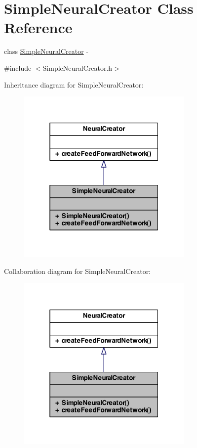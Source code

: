 \hypertarget{class_simple_neural_creator}{
\section{SimpleNeuralCreator Class Reference}
\label{class_simple_neural_creator}
}


class \hyperlink{class_simple_neural_creator}{SimpleNeuralCreator} -\/  




{\ttfamily \#include $<$SimpleNeuralCreator.h$>$}



Inheritance diagram for SimpleNeuralCreator:
\nopagebreak
\begin{figure}[H]
\begin{center}
\leavevmode
\includegraphics[width=244pt]{class_simple_neural_creator__inherit__graph}
\end{center}
\end{figure}


Collaboration diagram for SimpleNeuralCreator:
\nopagebreak
\begin{figure}[H]
\begin{center}
\leavevmode
\includegraphics[width=244pt]{class_simple_neural_creator__coll__graph}
\end{center}
\end{figure}
